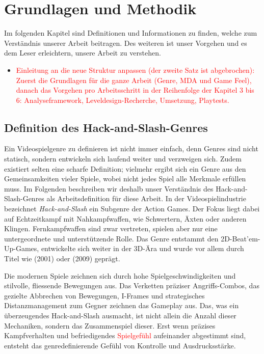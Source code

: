 \documentclass[../Main.tex]{subfiles}
\begin{document}
\section{Grundlagen und Methodik} \label{sec:Grundlagen}
Im folgenden Kapitel sind Definitionen und Informationen zu finden, welche zum Verständnis unserer Arbeit beitragen. Des weiteren ist unser Vorgehen  und es dem Leser erleichtern, unsere Arbeit zu verstehen.

\begin{itemize}[leftmargin=1.5cm]
    \item \textcolor{red}{Einleitung an die neue Struktur anpassen (der zweite Satz ist abgebrochen): Zuerst die Grundlagen für die ganze Arbeit (Genre, MDA und Game Feel), danach das Vorgehen pro Arbeitsschritt in der Reihenfolge der Kapitel 3 bis 6: Analyseframework, Leveldesign-Recherche, Umsetzung, Playtests.}
\end{itemize}

\subsection{Definition des Hack-and-Slash-Genres} \label{sec:Genredefinition}
Ein Videospielgenre zu definieren ist nicht immer einfach, denn Genres sind nicht statisch, sondern entwickeln sich laufend weiter und verzweigen sich. Zudem existiert selten eine scharfe Definition; vielmehr ergibt sich ein Genre aus den Gemeinsamkeiten vieler Spiele, wobei nicht jedes Spiel alle Merkmale erfüllen muss. Im Folgenden beschreiben wir deshalb unser Verständnis des Hack-and-Slash-Genres als Arbeitsdefinition für diese Arbeit. In der Videospielindustrie bezeichnet \textit{Hack-and-Slash} ein Subgenre der Action Games.\autocite{wikipedia_hackandslash} Der Fokus liegt dabei auf Echtzeitkampf mit Nahkampfwaffen, wie Schwertern, Äxten oder anderen Klingen. Fernkampfwaffen sind zwar vertreten, spielen aber nur eine untergeordnete und unterstützende Rolle. Das Genre entstammt den 2D-Beat'em-Up-Games, entwickelte sich weiter in der 3D-Ära und wurde vor allem durch Titel wie  (2001)\autocite{wikipedia_devilmaycry} oder  (2009)\autocite{wikipedia_bayonetta} geprägt.

Die modernen Spiele zeichnen sich durch hohe Spielgeschwindigkeiten und stilvolle, fliessende Bewegungen aus. Das Verketten präziser Angriffs-Combos, das gezielte Abbrechen von Bewegungen, I-Frames und strategisches Distanzmanagement zum Gegner zeichnen das Gameplay aus. Das, was ein überzeugendes Hack-and-Slash ausmacht, ist nicht allein die Anzahl dieser Mechaniken, sondern das Zusammenspiel dieser. Erst wenn präzises Kampfverhalten und befriedigendes \textcolor{red}{Spielgefühl} aufeinander abgestimmt sind, entsteht das genredefinierende Gefühl von Kontrolle und Ausdrucksstärke.\autocite[s.5-s.7]{lindgren2025striking}
\end{document}
